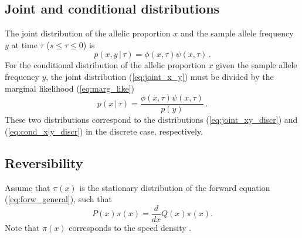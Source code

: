 \documentclass[preprint]{elsarticle}
\newcommand\given{{\,|\,}}
\begin{document}
\subsection{Joint and conditional distributions}

The joint distribution of the allelic proportion $x$ and the sample allele frequency $y$ at time $\tau$ ($s \le \tau \le 0$) is
\begin{equation}\label{eq:joint_x_y}
p(x,y \given \tau)= \phi(x, \tau)\psi(x,\tau)\,.
\end{equation}
For the conditional distribution of the allelic proportion $x$ given the sample allele frequency $y$, the joint distribution (\ref{eq:joint_x_y}) must be divided by the marginal likelihood (\ref{eq:marg_like})
\begin{equation}\label{eq:cond_x|y}
p(x\given \tau)= \frac{\phi(x, \tau)\psi(x,\tau)}{p(y)}\,.
\end{equation}
These two distributions correspond to the distributions (\ref{eq:joint_xy_discr}) and (\ref{eq:cond_x|y_discr}) in the discrete case, respectively. 

\subsection{Reversibility}

Assume that $\pi(x)$ is the stationary distribution of the forward equation (\ref{eq:forw_general}), such that 
\begin{equation}
P(x)\pi(x)=\frac{d}{d x}Q(x)\pi(x).
\end{equation}
Note that $\pi(x)$ corresponds to the speed density \citep{Ewen04,Song12}. 
\end{document}
